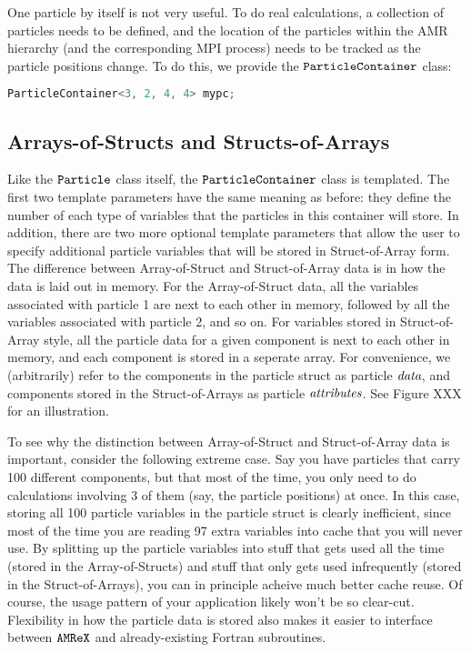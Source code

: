 One particle by itself is not very useful. To do real calculations, a collection of particles needs to be defined, and the location of the particles within the AMR hierarchy
(and the corresponding MPI process) needs to be tracked as the particle positions change. To do this, we provide the $\tt{ParticleContainer}$ class:

\begin{lstlisting}[language=cpp]
  ParticleContainer<3, 2, 4, 4> mypc;
\end{lstlisting}
   
\subsection{Arrays-of-Structs and Structs-of-Arrays}

Like the $\tt{Particle}$ class itself, the $\tt{ParticleContainer}$ class is templated. The first two template parameters have the same meaning as before: they define the number of each type of variables that the particles in this container will store. In addition, there are two more optional template parameters that allow the user to specify additional particle
variables that will be stored in Struct-of-Array form. The difference between Array-of-Struct and Struct-of-Array data is in how the data is laid
out in memory. For the Array-of-Struct data, all the variables associated with particle 1 are next to each other in memory, followed by all the variables associated with particle
2, and so on. For variables stored in Struct-of-Array style, all the particle data for a given component is next to each other in memory, and each component is stored in a seperate
array. For convenience, we (arbitrarily) refer to the components in the particle struct as particle $\emph{data}$, and components stored in the Struct-of-Arrays as particle
$\emph{attributes}$. See Figure XXX for an illustration.

To see why the distinction between Array-of-Struct and Struct-of-Array data is important, consider the following extreme case. Say you have particles that carry 100 different components,
but that most of the time, you only need to do calculations involving 3 of them (say, the particle positions) at once. In this case, storing all 100 particle variables in the particle
struct is clearly inefficient, since most of the time you are reading 97 extra variables into cache that you will never use. By splitting up the particle variables into stuff that gets 
used all the time (stored in the Array-of-Structs) and stuff that only gets used infrequently (stored in the Struct-of-Arrays), you can in principle acheive much better cache reuse. Of course, the usage pattern of your application likely won't be so clear-cut. Flexibility in how the particle data is stored also makes it easier to interface between $\tt{AMReX}$ and already-existing Fortran subroutines.

